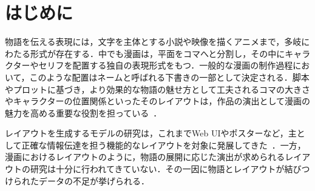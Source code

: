 

\def\Style{``jsaiac.sty''}
\def\BibTeX{{\rm B\kern-.05em{\sc i\kern-.025em b}\kern-.08em%
 T\kern-.1667em\lower.7ex\hbox{E}\kern-.125emX}}
\def\JBibTeX{\leavevmode\lower .6ex\hbox{J}\kern-0.15em\BibTeX}
\def\LaTeXe{\LaTeX\kern.15em2$_{\textstyle\varepsilon}$}


\maketitle

\section{はじめに}

物語を伝える表現には，文字を主体とする小説や映像を描くアニメまで，多岐にわたる形式が存在する．中でも漫画は，平面をコマへと分割し，その中にキャラクターやセリフを配置する独自の表現形式をもつ．一般的な漫画の制作過程において，このような配置はネームと呼ばれる下書きの一部として決定される．脚本やプロットに基づき，より効果的な物語の魅せ方として工夫されるコマの大きさやキャラクターの位置関係といったそのレイアウトは，作品の演出として漫画の魅力を高める重要な役割を担っている~\cite{koma}．

レイアウトを生成するモデルの研究は，これまでWeb UIやポスターなど，主として正確な情報伝達を担う機能的なレイアウトを対象に発展してきた~\cite{layout}．一方，漫画におけるレイアウトのように，物語の展開に応じた演出が求められるレイアウトの研究は十分に行われてきていない．その一因に物語とレイアウトが結びつけられたデータの不足が挙げられる．

